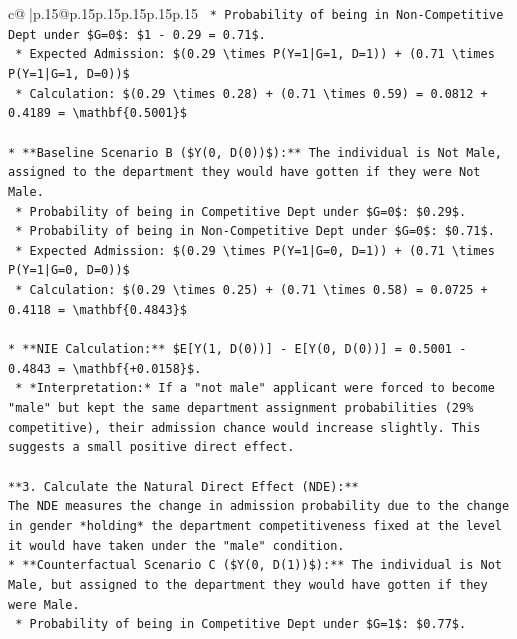 \documentclass{article}
\begin{document}
{\begin{supertabular}{c@{$\;$}|p{.15\linewidth}@{}p{.15\linewidth}p{.15\linewidth}p{.15\linewidth}p{.15\linewidth}p{.15\linewidth}}
{{{\texttt{    *   Probability of being in Non{-}Competitive Dept under \$G=0\$: \$1 {-} 0.29 = 0.71\$.} \\
\texttt{    *   Expected Admission: \$(0.29 \textbackslash{}times P(Y=1|G=1, D=1)) + (0.71 \textbackslash{}times P(Y=1|G=1, D=0))\$} \\
\texttt{    *   Calculation: \$(0.29 \textbackslash{}times 0.28) + (0.71 \textbackslash{}times 0.59) = 0.0812 + 0.4189 = \textbackslash{}mathbf\{0.5001\}\$} \\
\\ 
\texttt{*   **Baseline Scenario B (\$Y(0, D(0))\$):** The individual is Not Male, assigned to the department they would have gotten if they were Not Male.} \\
\texttt{    *   Probability of being in Competitive Dept under \$G=0\$: \$0.29\$.} \\
\texttt{    *   Probability of being in Non{-}Competitive Dept under \$G=0\$: \$0.71\$.} \\
\texttt{    *   Expected Admission: \$(0.29 \textbackslash{}times P(Y=1|G=0, D=1)) + (0.71 \textbackslash{}times P(Y=1|G=0, D=0))\$} \\
\texttt{    *   Calculation: \$(0.29 \textbackslash{}times 0.25) + (0.71 \textbackslash{}times 0.58) = 0.0725 + 0.4118 = \textbackslash{}mathbf\{0.4843\}\$} \\
\\ 
\texttt{*   **NIE Calculation:** \$E{[}Y(1, D(0)){]} {-} E{[}Y(0, D(0)){]} = 0.5001 {-} 0.4843 = \textbackslash{}mathbf\{+0.0158\}\$.} \\
\texttt{    *   *Interpretation:* If a "not male" applicant were forced to become "male" but kept the same department assignment probabilities (29\% competitive), their admission chance would increase slightly. This suggests a small positive direct effect.} \\
\\ 
\texttt{**3. Calculate the Natural Direct Effect (NDE):**} \\
\texttt{The NDE measures the change in admission probability due to the change in gender *holding* the department competitiveness fixed at the level it would have taken under the "male" condition.} \\
\texttt{*   **Counterfactual Scenario C (\$Y(0, D(1))\$):** The individual is Not Male, but assigned to the department they would have gotten if they were Male.} \\
\texttt{    *   Probability of being in Competitive Dept under \$G=1\$: \$0.77\$.} \\
}}}
\end{supertabular}}
\end{document}
